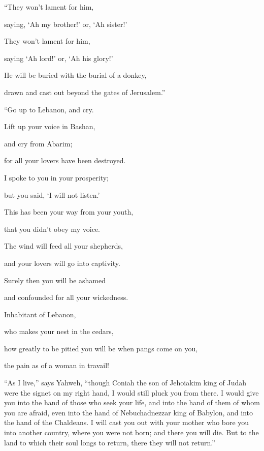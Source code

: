 {\par }{\Q “They won’t lament for him,
\par }{\QB saying, ‘Ah my brother!’ or, ‘Ah sister!’
\par }{\Q They won’t lament for him,
\par }{\QB saying ‘Ah lord!’ or, ‘Ah his glory!’
\par }{\Q {}He will be buried with the burial of a donkey,
\par }{\QB drawn and cast out beyond the gates of Jerusalem.”
\par }{\BB \par }{\Q {}“Go up to Lebanon, and cry.
\par }{\QB Lift up your voice in Bashan,
\par }{\Q and cry from Abarim;
\par }{\QB for all your lovers have been destroyed.
\par }{\Q {}I spoke to you in your prosperity;
\par }{\QB but you said, ‘I will not listen.’
\par }{\Q This has been your way from your youth,
\par }{\QB that you didn’t obey my voice.
\par }{\Q {}The wind will feed all your shepherds,
\par }{\QB and your lovers will go into captivity.
\par }{\Q Surely then you will be ashamed
\par }{\QB and confounded for all your wickedness.
\par }{\Q {}Inhabitant of Lebanon,
\par }{\QB who makes your nest in the cedars,
\par }{\Q how greatly to be pitied you will be when pangs come on you,
\par }{\QB the pain as of a woman in travail!
\par }{\PP {}“As I live,” says Yahweh, “though Coniah the son of Jehoiakim king of Judah were the signet on my right hand, I would still pluck you from there.
I would give you into the hand of those who seek your life, and into the hand of them of whom you are afraid, even into the hand of Nebuchadnezzar king of Babylon, and into the hand of the Chaldeans.
I will cast you out with your mother who bore you into another country, where you were not born; and there you will die.
But to the land to which their soul longs to return, there they will not return.”
}
